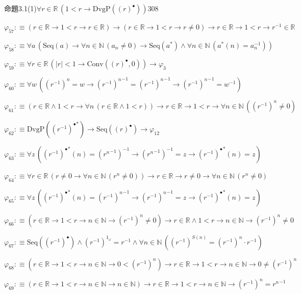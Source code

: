 \begin{fullproof}{命題3.1(1)}{$\forall r \in \mathbb{R}\,(1 < r \to \mathrm{DvgP}({(r)^{\bullet}}))$}{308}
\begin{abbrevlist}
\item $\varphi_{57} :\equiv (r \in \mathbb{R} \to 1 < r \to r \in \mathbb{R}) \to (r \in \mathbb{R} \to 1 < r \to r \neq 0) \to r \in \mathbb{R} \to 1 < r \to r^{-1} \in \mathbb{R}$
\item $\varphi_{58} :\equiv \forall a\,(\mathrm{Seq}(a) \to \forall n \in \mathbb{N}\,(a_{n} \neq 0) \to \mathrm{Seq}(a^{\ast}) \land \forall n \in \mathbb{N}\,(a^{\ast}(n) = a_{n}^{-1}))$
\item $\varphi_{59} :\equiv \forall r \in \mathbb{R}\,(\lvert r \rvert < 1 \to \mathrm{Conv}({(r)^{\bullet}},0)) \to \varphi_{3}$
\item $\varphi_{60} :\equiv \forall w\,({{(r^{-1})}^{n}} = w \to {{(r^{-1})}^{n}}^{-1} = {{(r^{-1})}^{n}}^{-1} \to {{(r^{-1})}^{n}}^{-1} = w^{-1})$
\item $\varphi_{61} :\equiv (r \in \mathbb{R} \land 1 < r \to \forall n\,(r \in \mathbb{R} \land 1 < r)) \to r \in \mathbb{R} \to 1 < r \to \forall n \in \mathbb{N}\,({{(r^{-1})}^{n}} \neq 0)$
\item $\varphi_{62} :\equiv \mathrm{DvgP}({(r^{-1})^{\bullet}}^{\ast}) \to \mathrm{Seq}({(r)^{\bullet}}) \to \varphi_{12}$
\item $\varphi_{63} :\equiv \forall z\,({(r^{-1})^{\bullet}}^{\ast}(n) = ({{r}^{n}}^{-1})^{-1} \to ({{r}^{n}}^{-1})^{-1} = z \to {(r^{-1})^{\bullet}}^{\ast}(n) = z)$
\item $\varphi_{64} :\equiv \forall r \in \mathbb{R}\,(r \neq 0 \to \forall n \in \mathbb{N}\,({{r}^{n}} \neq 0)) \to r \in \mathbb{R} \to r \neq 0 \to \forall n \in \mathbb{N}\,({{r}^{n}} \neq 0)$
\item $\varphi_{65} :\equiv \forall z\,({(r^{-1})^{\bullet}}^{\ast}(n) = {{(r^{-1})}^{n}}^{-1} \to {{(r^{-1})}^{n}}^{-1} = z \to {(r^{-1})^{\bullet}}^{\ast}(n) = z)$
\item $\varphi_{66} :\equiv (r \in \mathbb{R} \to 1 < r \to n \in \mathbb{N} \to {{(r^{-1})}^{n}} \neq 0) \to r \in \mathbb{R} \land 1 < r \to n \in \mathbb{N} \to {{(r^{-1})}^{n}} \neq 0$
\item $\varphi_{67} :\equiv \mathrm{Seq}({(r^{-1})^{\bullet}}) \land {{(r^{-1})}^{1_{\omega}}} = r^{-1} \land \forall n \in \mathbb{N}\,({{(r^{-1})}^{S(n)}} = {{(r^{-1})}^{n}} \cdot r^{-1})$
\item $\varphi_{68} :\equiv (r \in \mathbb{R} \to 1 < r \to n \in \mathbb{N} \to 0 < {{(r^{-1})}^{n}}) \to r \in \mathbb{R} \to 1 < r \to n \in \mathbb{N} \to 0 \neq {{(r^{-1})}^{n}}$
\item $\varphi_{69} :\equiv (r \in \mathbb{R} \to 1 < r \to n \in \mathbb{N} \to n \in \mathbb{N}) \to r \in \mathbb{R} \to 1 < r \to n \in \mathbb{N} \to {{(r^{-1})}^{n}} = {{r}^{n}}^{-1}$

\end{abbrevlist}
\end{fullproof}

